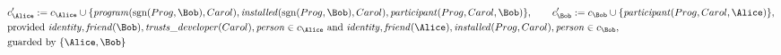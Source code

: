 \begin{align*}
&
c'_
{
\Alice
}
 := 
c_
{
\Alice
}
 \cup 
\{
\mathit{\detokenize{
program
}}
(
\mathrm{sgn}(
Prog
,
\Bob
)
,
Carol
)
,
\mathit{\detokenize{
installed
}}
(
\mathrm{sgn}(
Prog
,
\Bob
)
,
Carol
)
,
\mathit{\detokenize{
participant
}}
(
Prog
,
Carol
,
\Bob
)
\}
, \qquad 
c'_
{
\Bob
}
 := 
c_
{
\Bob
}
 \cup 
\{
\mathit{\detokenize{
participant
}}
(
Prog
,
Carol
,
\Alice
)
\}
,\\
&
\text{provided } 
\mathit{\detokenize{
identity
}}
,
\mathit{\detokenize{
friend
}}
(
\Bob
)
,
\mathit{\detokenize{
trusts_developer
}}
(
Carol
)
,
\mathit{\detokenize{
person
}}
 \in c_
{
\Alice
}
 \text{ and } 
\mathit{\detokenize{
identity
}}
,
\mathit{\detokenize{
friend
}}
(
\Alice
)
,
\mathit{\detokenize{
installed
}}
(
Prog
,
Carol
)
,
\mathit{\detokenize{
person
}}
 \in c_
{
\Bob
}
,\\
&
\text{guarded by } \{
\Alice
,
\Bob
\}
\end{align*}

